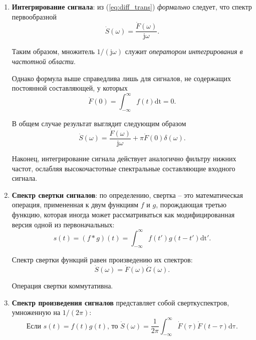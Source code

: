 \documentclass[12pt,a4paper]{article}
\begin{document}
\begin{enumerate}
\item \textbf{Интегрирование сигнала}: из (\ref{eq:diff_trans}) \emph{формально} следует, что спектр первообразной
\begin{equation}
\nonumber
\dot{S}\left(\omega\right)=\frac{\dot{F}\left(\omega\right)}{\mathrm{j}\omega}.
\end{equation}

Таким образом, множитель $1/(\mathrm{j}\omega)$ служит \emph{оператором интегрирования в частотной области}.

Однако формула выше справедлива лишь для сигналов, не содержащих постоянной составляющей, у которых
\begin{equation}
\nonumber
\dot{F}\left(0\right)=\int_{-\infty}^\infty f\left(t\right)\mathrm{dt}=0.
\end{equation}

В общем случае результат выглядит следующим образом
\begin{equation}
\nonumber
\dot{S}\left(\omega\right)=\frac{\dot{F}\left(\omega\right)}{\mathrm{j}\omega}+\pi\dot{F}\left(0\right)\delta\left(\omega\right).
\end{equation}

Наконец, интегрирование сигнала действует аналогично фильтру нижних частот, ослабляя высокочастотные спектральные составляющие входного сигнала.

\item \textbf{Спектр свертки сигналов}: по определению, свертка -- это математическая операция, примененная к двум функциям $f$ и $g$, порождающая третью функцию, которая иногда может рассматриваться как модифицированная версия одной из первоначальных:
\begin{equation}
\nonumber
s\left(t\right)=\left(f*g\right)\left(t\right)=\int_{-\infty}^\infty {f\left(t'\right)g\left(t-t'\right)\mathrm{dt'}}.
\end{equation}

Спектр свертки функций равен произведению их спектров:
\begin{equation}
\nonumber
\dot{S}\left(\omega\right)=\dot{F}\left(\omega\right)\dot{G}\left(\omega\right).
\end{equation}

Операция свертки коммутативна.

\item \textbf{Спектр произведения сигналов} представляет собой свертку\linebreak спектров, умноженную на $1/(2\pi )$:
\begin{equation}
\nonumber
\text{Если }
s\left(t\right)=f\left(t\right)g\left(t\right)
\text{, то }
\dot{S}\left(\omega\right)=\frac{1}{2\pi}\int_{-\infty}^\infty {\dot{F}\left(\tau\right)\dot{F}\left(t-\tau\right)\mathrm{d\tau}}.
\end{equation}


\end{enumerate}
\end{document}

